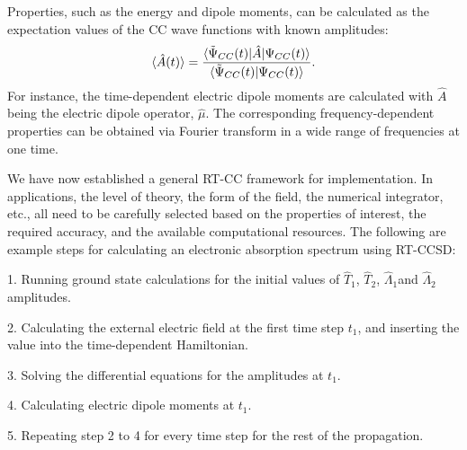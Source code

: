 Properties, such as the energy and dipole moments, can be calculated as the expectation values of the CC wave functions with known amplitudes: 
\begin{equation}
\langle \hat{A}(t) \rangle = \frac{\langle\tilde{\Psi}_{CC}(t) |\hat{A}| \Psi_{CC}(t) \rangle}{\langle\tilde{\Psi}_{CC}(t) | \Psi_{CC}(t) \rangle}.
\end{equation}
For instance, the time-dependent electric dipole moments are calculated with $\hat{A}$ being the electric dipole operator, $\hat{\mu}$. The corresponding frequency-dependent properties can be obtained via Fourier transform in a wide range of frequencies at one time. 

We have now established a general RT-CC framework for implementation. In applications, the level of theory, the form of the field, the numerical integrator, etc., all need to be carefully selected based on the properties of interest, the required accuracy, and the available computational resources. The following are example steps for calculating an electronic absorption spectrum using RT-CCSD:

1. Running ground state calculations for the initial values of $\hat{T}_{1}$, $\hat{T}_{2}$, $\hat{\Lambda}_{1}$and $\hat{\Lambda}_{2}$ amplitudes. 

2. Calculating the external electric field at the first time step $t_{1}$, and inserting the value into the time-dependent Hamiltonian.

3. Solving the differential equations for the amplitudes at $t_{1}$. 
 
4. Calculating electric dipole moments at $t_{1}$.

5. Repeating step 2 to 4 for every time step for the rest of the propagation.

